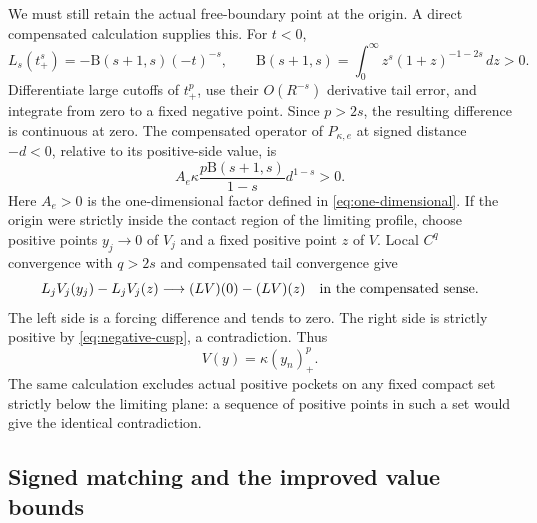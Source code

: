 \documentclass[11pt]{article}
\numberwithin{equation}{section}
\newcommand{\Bfun}{\mathrm B}
\begin{document}
We must still retain the actual free-boundary point at the origin. A direct
compensated calculation supplies this. For $t<0$,
\[
 L_s(t_+^s)=-\Bfun(s+1,s)(-t)^{-s},\qquad
 \Bfun(s+1,s)=\int_0^\infty z^s(1+z)^{-1-2s}\,dz>0.
\]
Differentiate large cutoffs of $t_+^p$, use their $O(R^{-s})$ derivative
tail error, and integrate from zero to a fixed negative point. Since
$p>2s$, the resulting difference is continuous at zero. The compensated
operator of $P_{\kappa,e}$ at signed distance $-d<0$, relative to its
positive-side value, is
\begin{equation}\label{eq:negative-cusp}
                 A_e\kappa\frac{p\Bfun(s+1,s)}{1-s}d^{1-s}>0.
\end{equation}
Here $A_e>0$ is the one-dimensional factor defined in
\eqref{eq:one-dimensional}.
If the origin were strictly inside the contact region of the limiting
profile, choose positive points $y_j\to0$ of $V_j$ and a fixed positive
point $z$ of $V$. Local $C^q$ convergence with $q>2s$ and compensated tail
convergence give
\[
 L_jV_j(y_j)-L_jV_j(z)
             \longrightarrow (LV)(0)-(LV)(z)
                         \quad\hbox{in the compensated sense}.
\]
The left side is a forcing difference and tends to zero. The right side is
strictly positive by \eqref{eq:negative-cusp}, a contradiction. Thus
\begin{equation}\label{eq:centered-inner-limit}
                              V(y)=\kappa(y_n)_+^p.
\end{equation}
The same calculation excludes actual positive pockets on any fixed compact
set strictly below the limiting plane: a sequence of positive points in
such a set would give the identical contradiction.

\subsection{Signed matching and the improved value bounds}
\end{document}
